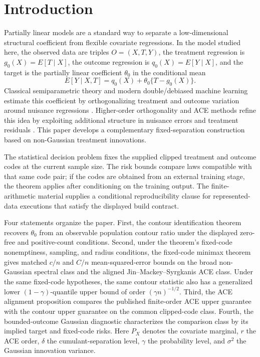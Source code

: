 \documentclass[11pt]{article}
\begin{document}
\section{Introduction}

Partially linear models are a standard way to separate a low-dimensional structural coefficient from flexible covariate regressions. In the model studied here, the observed data are triples \(O=(X,T,Y)\), the treatment regression is \(g_0(X)=E[T\mid X]\), the outcome regression is \(q_0(X)=E[Y\mid X]\), and the target is the partially linear coefficient \(\theta_0\) in the conditional mean
\[
E[Y\mid X,T]=q_0(X)+\theta_0\{T-g_0(X)\}.
\]
Classical semiparametric theory and modern double/debiased machine learning estimate this coefficient by orthogonalizing treatment and outcome variation around nuisance regressions \citep{Robinson1988,Newey1990,Newey1994,NeweyMcFadden1994,BickelKlaassenRitovWellner1993,VanDerVaart1998,VanDerVaartWellner1996,BelloniChernozhukovHansen2014,ChernozhukovEtAl2018DML}. Higher-order orthogonality and ACE methods refine this idea by exploiting additional structure in nuisance errors and treatment residuals \citep{RobinsLiTchetgenVanDerVaart2008,LiuMukherjeeNeweyRobins2017,NeweyRobins2018,LiuMukherjeeRobinsTchetgen2021,MackeySyrgkanisZadik2018,JinMackeySyrgkanis2025}. This paper develops a complementary fixed-separation construction based on non-Gaussian treatment innovations.

The statistical decision problem fixes the supplied clipped treatment and outcome codes at the current sample size. The risk bounds compare laws compatible with that same code pair; if the codes are obtained from an external training stage, the theorem applies after conditioning on the training output. The finite-arithmetic material supplies a conditional reproducibility clause for represented-data executions that satisfy the displayed build contract.

Four statements organize the paper. First, the contour identification theorem recovers \(\theta_0\) from an observable population contour ratio under the displayed zero-free and positive-count conditions. Second, under the theorem's fixed-code nonemptiness, sampling, and radius conditions, the fixed-code minimax theorem gives matched \(c/n\) and \(C/n\) mean-squared-error bounds on the broad non-Gaussian spectral class and the aligned Jin--Mackey--Syrgkanis ACE class. Under the same fixed-code hypotheses, the same contour statistic also has a generalized lower \((1-\gamma)\)-quantile upper bound of order \((\gamma n)^{-1/2}\). Third, the ACE alignment proposition compares the published finite-order ACE upper guarantee with the contour upper guarantee on the common clipped-code class. Fourth, the bounded-outcome Gaussian diagnostic characterizes the comparison class by its implied target and fixed-code risks. Here \(P_X\) denotes the covariate marginal, \(r\) the ACE order, \(\delta\) the cumulant-separation level, \(\gamma\) the probability level, and \(\sigma^2\) the Gaussian innovation variance.
\end{document}
